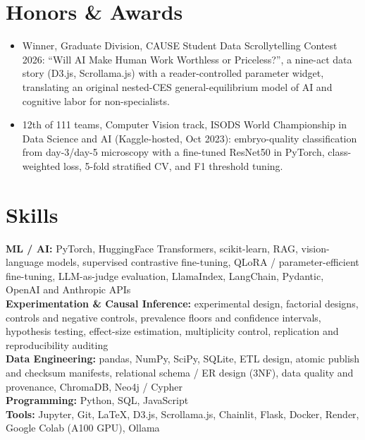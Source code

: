 \documentclass[letterpaper,10pt]{article}
\begin{document}
\section{Honors \& Awards}
\begin{itemize}
  \item Winner, Graduate Division, CAUSE Student Data Scrollytelling Contest 2026: ``Will AI Make Human Work Worthless or Priceless?'', a nine-act data story (D3.js, Scrollama.js) with a reader-controlled parameter widget, translating an original nested-CES general-equilibrium model of AI and cognitive labor for non-specialists.
  \item 12th of 111 teams, Computer Vision track, ISODS World Championship in Data Science and AI (Kaggle-hosted, Oct 2023): embryo-quality classification from day-3/day-5 microscopy with a fine-tuned ResNet50 in PyTorch, class-weighted loss, 5-fold stratified CV, and F1 threshold tuning.
\end{itemize}

\section{Skills}
\textbf{ML / AI:} PyTorch, HuggingFace Transformers, scikit-learn, RAG, vision-language models, supervised contrastive fine-tuning, QLoRA / parameter-efficient fine-tuning, LLM-as-judge evaluation, LlamaIndex, LangChain, Pydantic, OpenAI and Anthropic APIs \\[1pt]
\textbf{Experimentation \& Causal Inference:} experimental design, factorial designs, controls and negative controls, prevalence floors and confidence intervals, hypothesis testing, effect-size estimation, multiplicity control, replication and reproducibility auditing \\[1pt]
\textbf{Data Engineering:} pandas, NumPy, SciPy, SQLite, ETL design, atomic publish and checksum manifests, relational schema / ER design (3NF), data quality and provenance, ChromaDB, Neo4j / Cypher \\[1pt]
\textbf{Programming:} Python, SQL, JavaScript \\[1pt]
\textbf{Tools:} Jupyter, Git, LaTeX, D3.js, Scrollama.js, Chainlit, Flask, Docker, Render, Google Colab (A100 GPU), Ollama
\end{document}
